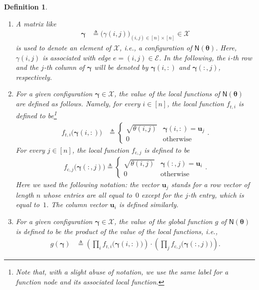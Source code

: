 \documentclass[journal,lettersize,twocolumn]{IEEEtran} %
\newtheorem{definition}[theorem]{Definition}
\newcommand{\vect}[1]{ \bm{#1} }
\newcommand{\set}[1]{\mathcal{#1}}
\newcommand{\vgam}{ \vect{\gamma} }
\newcommand{\setEfull}{ \mathcal{E} }
\newcommand{\sfN}{ \mathsf{N} }
\newcommand{\matr}[1]{ \bm{#1} }
\newcommand{\defeq}{ \triangleq }
\newcommand{\fr}[1]{ f_{ \mathrm{r}, #1 } }
\newcommand{\fc}[1]{ f_{ \mathrm{c}, #1 } }
\newcommand{\setX}{ \set{X} }
\newcommand{\vvu}{\bm{u}}
\newcommand{\vui}{\vvu_{i}}
\newcommand{\vuj}{\vvu_{j}}
\newcommand{\mtheta}{\matr{\theta}}
\newcommand{\vgamzo}{\vgam}
\newcommand{\gamzo}{\gamma}
\newcommand{\ie}{\textit{i.e.}}
\begin{document}
\begin{definition}
\begin{enumerate}
  \item A matrix like
    \begin{align*}
      \vgamzo
        &\defeq
           \bigl( 
             \gamzo(i,j)
           \bigr)_{(i,j) \in [n] \times [n]}
             \in \setX
    \end{align*} 
    is used to denote an element of $ \set{X} $, \ie, a configuration of
    $ \sfN(\mtheta) $. Here, $ \gamma(i,j) $ is associated with edge
    $ e = (i,j) \in \setEfull$. In the following, the $i$-th row and the
    $j$-th column of $\vgamzo$ will be denoted by $ \vgamzo(i,:) $ and
    $ \vgamzo(:,j) $, respectively.

  \item For a given configuration $\vgamzo \in \setX$, the value of the local
    functions of $\sfN(\mtheta)$ are defined as follows. Namely, for every
    $ i \in [n] $, the local function $ \fr{i} $ is defined to
    be\footnote{Note that, with a slight abuse of notation, we use the same
      label for a function node and its associated local function.}
    \begin{align*}
      \fr{i}\bigl( \vgamzo(i,:) \bigr)
        &\defeq
           \begin{cases}
             \sqrt{ \theta(i,j) } & \vgamzo(i,:) = \vuj  \\
             0                    & \text{otherwise}
          \end{cases}.
    \end{align*}
    For every $ j \in [n] $, the local function $ \fc{j} $ is defined to be
    \begin{align*}
        \fc{j}\bigl( \vgamzo(:,j) \bigr) \defeq
        \begin{cases}
            \sqrt{ \theta(i,j) } & \vgamzo(:,j) = \vui \\
            0 & \text{otherwise}
        \end{cases}.
    \end{align*}
    Here we used the following notation: the vector $\vuj$ stands for a row
    vector of length $n$ whose entries are all equal to~$0$ except for the
    $j$-th entry, which is equal to~$1$. The column vector $\vui$ is defined
    similarly.
  
  \item For a given configuration $\vgamzo \in \setX$, the value of the global
    function $g$ of $\sfN(\mtheta)$ is defined to be the product of the value
    of the local functions, \ie,
    \begin{align*}
      g(\vgamzo)
        &\defeq
           \left( 
             \prod_{i} 
               \fr{i}\bigl( \vgamzo(i,:) \bigr)
           \right)
          \cdot
          \left(
            \prod_{j}
              \fc{j}\bigl( \vgamzo(:,j) \bigr) 
          \right) .
    \end{align*}
  

\end{enumerate}
\end{definition}
\end{document}
